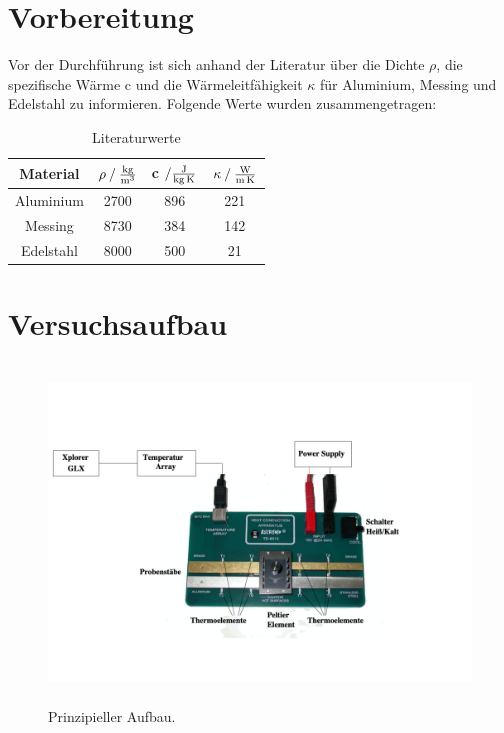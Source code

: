 \section{Vorbereitung}
Vor der Durchführung ist sich anhand der Literatur über die Dichte $\rho$, die spezifische Wärme c und die Wärmeleitfähigkeit $\kappa$ für Aluminium, Messing und Edelstahl zu informieren.
Folgende Werte wurden zusammengetragen:

\begin{table}
\centering
\begin{tabular}{c c c c }
\toprule
{Material} &{$ \rho \mathbin{/} \si[per-mode=fraction]{\kilo\gram\per\cubic\meter} $} & {c $ \mathbin{/} \si[per-mode=fraction]{\joule\per\kilo\gram\per\kelvin} $} & {$ \kappa \mathbin{/} \si[per-mode=fraction]{\watt\per\meter\per\kelvin} $} \\
\midrule
Aluminium & 2700 & 896 & 221 \\
Messing   & 8730 & 384 & 142 \\
Edelstahl & 8000 & 500 & 21  \\
\bottomrule
\end{tabular}
\caption{Literaturwerte}
\label{tab:literaturwerte}
\end{table}

\newpage
\section{Versuchsaufbau}

\begin{figure}
            \centering
               \includegraphics[height=9cm]{V204_aufbau.pdf}
               \caption{Prinzipieller Aufbau.}
               \label{fig:aufbauwaermeleitung}
        \end{figure}

